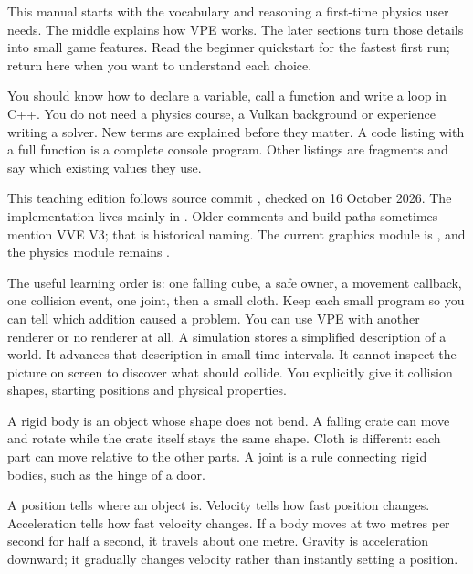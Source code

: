 \documentclass[11pt,a4paper]{article}
\begin{document}
\tableofcontents
{}
This manual starts with the vocabulary and reasoning a first-time physics user needs. The middle explains how VPE works. The later sections turn those details into small game features. Read the beginner quickstart for the fastest first run; return here when you want to understand each choice.

You should know how to declare a variable, call a function and write a loop in C++. You do not need a physics course, a Vulkan background or experience writing a solver. New terms are explained before they matter. A code listing with a full  function is a complete console program. Other listings are fragments and say which existing values they use.

This teaching edition follows source commit , checked on 16 October 2026. The implementation lives mainly in . Older comments and build paths sometimes mention VVE V3; that is historical naming. The current graphics module is , and the physics module remains .

The useful learning order is: one falling cube, a safe owner, a movement callback, one collision event, one joint, then a small cloth. Keep each small program so you can tell which addition caused a problem. You can use VPE with another renderer or no renderer at all.
A simulation stores a simplified description of a world. It advances that description in small time intervals. It cannot inspect the picture on screen to discover what should collide. You explicitly give it collision shapes, starting positions and physical properties.

A rigid body is an object whose shape does not bend. A falling crate can move and rotate while the crate itself stays the same shape. Cloth is different: each part can move relative to the other parts. A joint is a rule connecting rigid bodies, such as the hinge of a door.

A position tells where an object is. Velocity tells how fast position changes. Acceleration tells how fast velocity changes. If a body moves at two metres per second for half a second, it travels about one metre. Gravity is acceleration downward; it gradually changes velocity rather than instantly setting a position.
\end{document}
